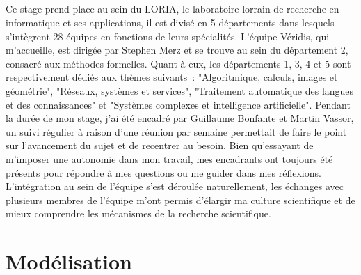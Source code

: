 \documentclass[oneside, a4paper, 11pt]{book}
\begin{document}
\paragraph{} 
Ce stage prend place au sein du LORIA, le laboratoire lorrain de recherche en informatique et ses applications, il est divisé en 5 départements dans lesquels s'intègrent 28 équipes en fonctions de leurs spécialités.
L'équipe Véridis, qui m'accueille, est dirigée par Stephen Merz et se trouve au sein du département 2, consacré aux méthodes formelles. Quant à eux, les départements 1, 3, 4 et 5 sont respectivement dédiés aux thèmes suivants~: "Algoritmique, calculs, images et géométrie", "Réseaux, systèmes et services", "Traitement automatique des langues et des connaissances" et "Systèmes complexes et intelligence artificielle".
Pendant la durée de mon stage, j'ai été encadré par Guillaume Bonfante et Martin Vassor, un suivi régulier à raison d'une réunion par semaine permettait de faire le point sur l'avancement du sujet et de recentrer au besoin.
Bien qu'essayant de m'imposer une autonomie dans mon travail, mes encadrants ont toujours été présents pour répondre à mes questions ou me guider dans mes réflexions.
L'intégration au sein de l'équipe s'est déroulée naturellement, les échanges avec plusieurs membres de l'équipe m'ont permis d'élargir ma culture scientifique et de mieux comprendre les mécanismes de la recherche scientifique.



\chapter{Modélisation}
\label{sec:modele}

\end{document}
